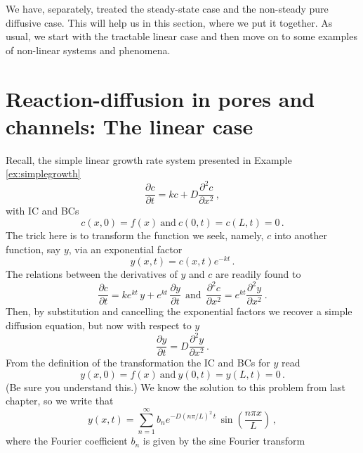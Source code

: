 
We have, separately, treated the steady-state case and the non-steady pure diffusive case. 
This will help us in this section, where we put it together. As usual, we start with the 
tractable linear case and then move on to some examples of non-linear systems and phenomena.

\section{Reaction-diffusion in pores and channels: The linear case}
Recall, the simple linear growth rate system presented in Example
\ref{ex:simplegrowth}
\begin{equation}
	\label{eq:simplerdgrowth}
  \frac{\partial c}{\partial t} = kc + D\frac{\partial^2 c}{\partial x^2}  \, ,
\end{equation}
with IC and BCs 
\begin{equation}
  c(x,0) = f(x) \ \text{and} \ c(0,t)=c(L,t)=0 \, .
\end{equation}
The trick here is to transform the function we seek, namely, $c$ into another 
function, say $y$, via an exponential factor
\begin{equation}
  y(x,t) = c(x,t)e^{-k t} \, .
\end{equation}
The relations between the derivatives of $y$ and $c$ are readily found to 
\begin{equation}
  \frac{\partial c}{\partial t} = ke^{kt} \, y + e^{kt} \, \frac{\partial y}{\partial t}
  \ \ \text{and} \ \ \frac{\partial^2 c}{\partial x^2} = e^{kt}  \frac{\partial^2 
    y}{\partial x^2}  \ .
\end{equation}
Then, by substitution and cancelling the exponential factors we recover a simple
diffusion equation, but now with respect to $y$
\begin{equation}
  \frac{\partial y}{\partial t} = D\frac{\partial^2 y}{\partial x^2} \, .
\end{equation}
From the definition of the transformation the IC and BCs for $y$ read
\begin{equation}
  y(x,0) = f(x) \ \text{and} \ y(0,t)=y(L, t)=0 \, .
\end{equation}
(Be sure you understand this.) We know the solution to this problem from last chapter, so we write that 
\begin{equation}
  y(x,t) = \sum_{n=1}^\infty b_n e^{-D\left(n\pi/L\right)^2 \, t} \,
	\sin\left(\frac{n\pi x}{L} \right) \, ,
\end{equation}
where the Fourier coefficient $b_n$ is given by the sine Fourier transform
